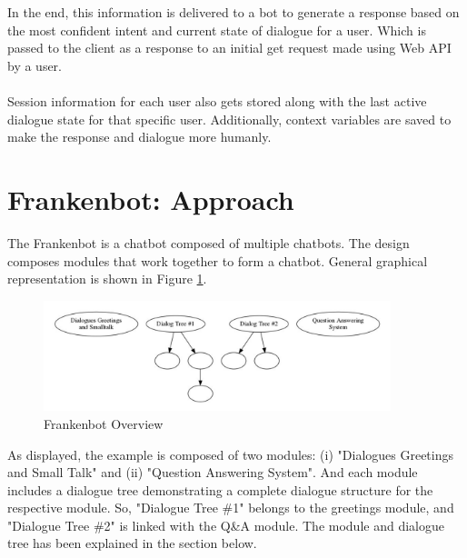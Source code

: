 \\~\\
In the end, this information is delivered to a bot to generate a response based on the most confident intent and current state of dialogue for a user. Which is passed to the client as a response to an initial get request made using Web API by a user.
\\~\\
Session information for each user also gets stored along with the last active dialogue state for that specific user. Additionally, context variables are saved to make the response and dialogue more humanly.

\section{Frankenbot: Approach}
The Frankenbot is a chatbot composed of multiple chatbots. The design composes modules that work together to form a chatbot. General graphical representation is shown in Figure \ref{fig:frankOver}. 
\begin{figure}[h]
    \centering
    \includegraphics[width=0.9\textwidth]{img/Frankenbot_Overview.PNG}
    \caption{Frankenbot Overview}
    \label{fig:frankOver}
\end{figure}

\noindent
As displayed, the example is composed of two modules: (i) "Dialogues Greetings and Small Talk" and (ii) "Question Answering System". And each module includes a dialogue tree demonstrating a complete dialogue structure for the respective module. So, "Dialogue Tree \#1" belongs to the greetings module, and "Dialogue Tree \#2" is linked with the Q\&A module. The module and dialogue tree has been explained in the section below.

